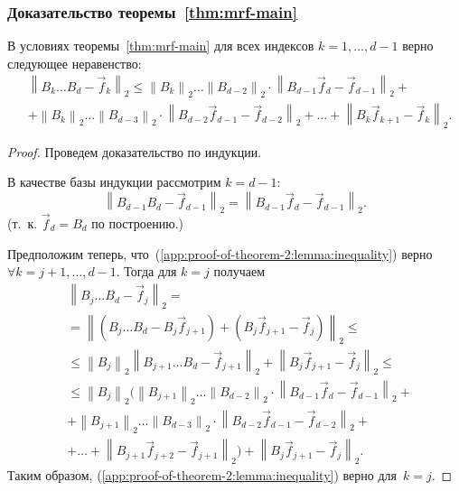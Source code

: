 \subsubsection{Доказательство теоремы~\ref{thm:mrf-main}}

\begin{lemma}
\label{app:proof-of-theorem-2:lemma}
В условиях теоремы~\ref{thm:mrf-main} для всех индексов $k = 1, \ldots, d - 1$ верно следующее неравенство:
\begin{equation}
\begin{aligned}
\label{app:proof-of-theorem-2:lemma:inequality}
&\left\| B_k \ldots B_d - \vec{f}_k \right\|_2 \leq
\left\| B_k \right\|_2 \ldots \left\| B_{d - 2} \right\|_2 \cdot \left\| B_{d - 1}\vec{f}_d - \vec{f}_{d - 1}\right\|_2 + \\
 &+ {} \left\| B_k \right\|_2 \ldots \left\| B_{d - 3} \right\|_2 \cdot \left\| B_{d - 2}\vec{f}_{d - 1} - \vec{f}_{d - 2} \right\|_2 +
{} \ldots + \left\| B_k\vec{f}_{k + 1} - \vec{f}_k \right\|_2.
\end{aligned}
\end{equation}
\end{lemma}

\begin{proof}
Проведем доказательство по индукции.

В качестве базы индукции рассмотрим $k = d - 1$:
\begin{equation*}
\left\| B_{d - 1}B_d - \vec{f}_{d - 1} \right\|_2 = \left\| B_{d - 1}\vec{f}_d - \vec{f}_{d - 1} \right\|_2.
\end{equation*}
(т.~к. $\vec{f}_d = B_d$ по построению.)

Предположим теперь, что~(\ref{app:proof-of-theorem-2:lemma:inequality}) верно $\forall k = j + 1, \ldots, d - 1$. Тогда для $k = j$ получаем
\begin{align*}
&\left\| B_j \ldots B_d - \vec{f}_j \right\|_2 = \\
& = \left\| (B_j \ldots B_d - B_j\vec{f}_{j + 1}) + (B_j\vec{f}_{j + 1} - \vec{f}_j) \right\|_2 \leq \\
& \leq \left\| B_j \right\|_2 \left\| B_{j + 1} \ldots B_d - \vec{f}_{j + 1} \right\|_2 + \left\| B_j\vec{f}_{j + 1} - \vec{f}_j \right\|_2 \leq \\
&\leq \left\| B_j \right\|_2 (
\left\| B_{j + 1} \right\|_2 \ldots \left\| B_{d - 2} \right\|_2 \cdot \left\| B_{d - 1}\vec{f}_d - \vec{f}_{d - 1}\right\|_2 + \\
& + \left\| B_{j + 1} \right\|_2 \ldots \left\| B_{d - 3} \right\|_2 \cdot \left\| B_{d - 2}\vec{f}_{d - 1} - \vec{f}_{d - 2} \right\|_2 +  \\
& + \ldots + \left\| B_{j + 1}\vec{f}_{j + 2} - \vec{f}_{j + 1} \right\|_2
) + \left\| B_j\vec{f}_{j + 1} - \vec{f}_j \right\|_2.
\end{align*}
Таким образом, (\ref{app:proof-of-theorem-2:lemma:inequality}) верно для~$k = j$.
\end{proof}

